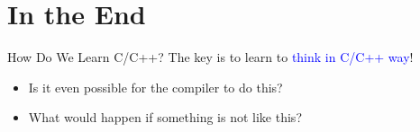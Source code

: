 \documentclass[handout]{beamer}
\newcommand{\blue}[1]{\textcolor{blue}{#1}}
\begin{document}
\section{In the End}

\begin{frame}{How Do We Learn C/C++?}
    The key is to learn to \blue{think in C/C++ way}!
    \pause
    \begin{itemize}
        \item Is it even possible for the compiler to do this?
        \pause
        \item What would happen if something is not like this?
    \end{itemize}
\end{frame}
\end{document}
